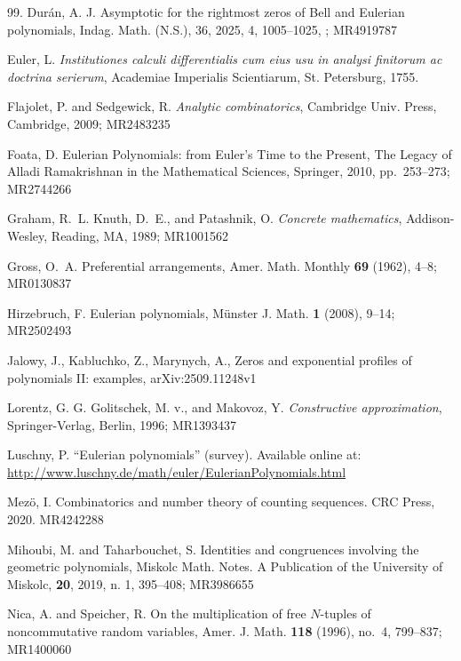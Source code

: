 \documentclass[11pt]{article}
\begin{document}
\begin{thebibliography}{99.}
Dur\'an, A. J.
 {Asymptotic for the rightmost zeros of {B}ell and {E}ulerian
              polynomials},
 {Indag. Math. (N.S.)},
 {36},
{2025},
{4},
{1005--1025},
     ; MR4919787


 Euler, L. \textit{Institutiones calculi differentialis cum eius usu in analysi finitorum ac doctrina serierum}, Academiae Imperialis Scientiarum, St. Petersburg, 1755.


 Flajolet, P.  and Sedgewick, R.  {\it Analytic combinatorics}, Cambridge Univ. Press, Cambridge, 2009; MR2483235

Foata, D.
Eulerian Polynomials: from Euler's Time to the Present,
The Legacy of Alladi Ramakrishnan in the Mathematical Sciences, Springer, 2010, pp.~253--273; MR2744266



 Graham, R.~L. Knuth,   D.~E., and  Patashnik, O. {\it Concrete mathematics}, Addison-Wesley, Reading, MA, 1989; MR1001562

 Gross, O.~A.  Preferential arrangements, Amer. Math. Monthly {\bf 69} (1962), 4--8; MR0130837

Hirzebruch, F.
Eulerian polynomials,
M\"unster J. Math. \textbf{1} (2008), 9--14; MR2502493

 Jalowy, J., Kabluchko, Z., Marynych, A., Zeros and exponential profiles of polynomials II: examples,  arXiv:2509.11248v1


Lorentz, G. G. Golitschek, M. v., and Makovoz,
              Y.
\textit{Constructive approximation}, {Springer-Verlag, Berlin}, {1996}; MR1393437

 Luschny, P. ``Eulerian polynomials'' (survey). Available online at: \url{http://www.luschny.de/math/euler/EulerianPolynomials.html}

 Mezö, I. Combinatorics and number theory of counting sequences. CRC Press, 2020. MR4242288

 Mihoubi, M. and Taharbouchet, S. Identities and congruences involving the geometric polynomials, Miskolc Math. Notes. A Publication of the University of  Miskolc,  {\bf 20}, 2019, n. 1, 395--408; MR3986655



 Nica, A. and Speicher,  R. On the multiplication of free $N$-tuples of noncommutative random variables, Amer. J. Math. {\bf 118} (1996), no.~4, 799--837; MR1400060


\end{thebibliography}
\end{document}
